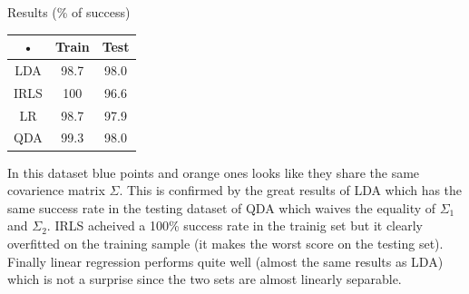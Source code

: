 \documentclass[a4paper]{article}
\begin{document}
\begin{minipage}[c]{0,35\textwidth}
Results (\% of success)\\
\begin{tabular}{|c|c|c|}
\hline 
• & Train & Test \\ 
\hline 
LDA & 98.7 & 98.0 \\ 
\hline 
IRLS & 100 & 96.6 \\ 
\hline 
LR & 98.7 & 97.9 \\ 
\hline 
QDA & 99.3 & 98.0 \\ 
\hline 
\end{tabular} 
\end{minipage}
\begin{minipage}{0,6\textwidth}
In this dataset blue points and orange ones looks like they share the same covarience matrix $\Sigma$. This is confirmed by the great results of LDA which has the same success rate in the testing dataset of QDA which waives the equality of $\Sigma_1$ and $\Sigma_2$. IRLS acheived a 100\% success rate in the trainig set but it clearly overfitted on the training sample (it makes the worst score on the testing set). Finally linear regression performs quite well (almost the same results as LDA) which is not a surprise since the two sets are almost linearly separable.
\end{minipage}
\newpage
\end{document}
